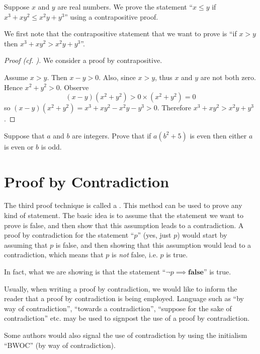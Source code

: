 \begin{example}
    Suppose $x$ and $y$ are real numbers. We prove the statement ``$x \leq y$ if $x^3 + xy^2 \leq x^2y + y^3$'' using a contrapositive proof.

    We first note that the contrapositive statement that we want to prove is ``if $x > y$ then $x^3 + xy^2 > x^2y + y^3$''.

    \begin{proof}[Proof (cf. {\cite[p.~130]{hammack_2018}})]
        We consider a proof by contrapositive.

        Assume $x > y$. Then $x - y > 0$. Also, since $x > y$, thus $x$ and $y$ are not both zero. Hence $x^2 + y^2 > 0$.
        Observe
        \[
            (x-y)(x^2+y^2) > 0 \times (x^2+y^2) = 0
        \]
        so $(x-y)(x^2+y^2) = x^3 + xy^2 - x^2y - y^3 > 0$. Therefore $x^3 + xy^2 > x^2y + y^3$.
    \end{proof}
\end{example}

\begin{exercise}
    Suppose that $a$ and $b$ are integers. Prove that if $a(b^2 + 5)$ is even then either $a$ is even or $b$ is odd.
\end{exercise}

\section{Proof by Contradiction}
The third proof technique is called a . This method can be used to prove any kind of statement. The basic idea is to assume that the statement we want to prove is false, and then show that this assumption leads to a contradiction. A proof by contradiction for the statement ``$p$'' (yes, just $p$) would start by assuming that $p$ is false, and then showing that this assumption would lead to a contradiction, which means that $p$ is \textit{not} false, i.e. $p$ is true.
\begin{remark}
    In fact, what we are showing is that the statement ``$\lnot p \implies \textbf{false}$'' is true.
\end{remark}

Usually, when writing a proof by contradiction, we would like to inform the reader that a proof by contradiction is being employed. Language such as ``by way of contradiction'', ``towards a contradiction'', ``suppose for the sake of contradiction'' etc. may be used to signpost the use of a proof by contradiction.
\begin{remark}
    Some authors would also signal the use of contradiction by using the initialism ``BWOC'' (by way of contradiction).
\end{remark}

